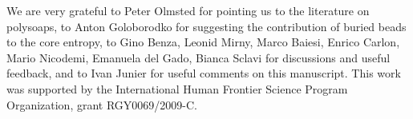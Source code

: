\documentclass[
preprint,
a4paper,
12pt,
superscriptaddress,
pre]{revtex4}
\begin{document}





\begin{acknowledgments}
  We are very grateful to Peter Olmsted for pointing us to the
  literature on polysoaps, to Anton Goloborodko for suggesting the
  contribution of buried beads to the core entropy, to Gino Benza,
  Leonid Mirny, Marco Baiesi, Enrico Carlon, Mario Nicodemi, Emanuela
  del Gado, Bianca Sclavi
  for discussions and useful feedback, and to Ivan Junier 
  for useful comments on this manuscript.  This work was supported by
  the International Human Frontier Science Program Organization, grant
  RGY0069/2009-C.
\end{acknowledgments}



    
\end{document}
